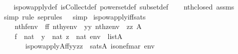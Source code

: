 \begin{isabellebody}
%
\isadelimproof
\ \ %
\endisadelimproof
%
\isatagproof
{}\isamarkupfalse%
\ is{\isacharunderscore}{\kern0pt}powapply{\isacharunderscore}{\kern0pt}def\ is{\isacharunderscore}{\kern0pt}Collect{\isacharunderscore}{\kern0pt}def\ powerset{\isacharunderscore}{\kern0pt}def\ subset{\isacharunderscore}{\kern0pt}def\isanewline
\ \ \isamarkupfalse%
\ nth{\isacharunderscore}{\kern0pt}closed\ assms\isanewline
\ \ \ \isamarkupfalse%
\ {\isacharparenleft}{\kern0pt}simp{\isacharparenright}{\kern0pt}\ {\isacharparenleft}{\kern0pt}rule\ sep{\isacharunderscore}{\kern0pt}rules\ \ {\isacharbar}{\kern0pt}\ simp{\isacharparenright}{\kern0pt}{\isacharplus}{\kern0pt}%
\endisatagproof
{\isafoldproof}%
%
\isadelimproof
\isanewline
%
\endisadelimproof
\isanewline
{}\isamarkupfalse%
\ is{\isacharunderscore}{\kern0pt}powapply{\isacharunderscore}{\kern0pt}iff{\isacharunderscore}{\kern0pt}sats{\isacharcolon}{\kern0pt}\isanewline
\ \ \isanewline
\ \ \ \ {\isachardoublequoteopen}nth{\isacharparenleft}{\kern0pt}f{\isacharcomma}{\kern0pt}env{\isacharparenright}{\kern0pt}\ {\isacharequal}{\kern0pt}\ ff{\isachardoublequoteclose}\ {\isachardoublequoteopen}nth{\isacharparenleft}{\kern0pt}y{\isacharcomma}{\kern0pt}env{\isacharparenright}{\kern0pt}\ {\isacharequal}{\kern0pt}\ yy{\isachardoublequoteclose}\ {\isachardoublequoteopen}nth{\isacharparenleft}{\kern0pt}z{\isacharcomma}{\kern0pt}env{\isacharparenright}{\kern0pt}\ {\isacharequal}{\kern0pt}\ zz{\isachardoublequoteclose}\ {\isachardoublequoteopen}{}{\isasymin}A{\isachardoublequoteclose}\isanewline
\ \ \ \ {\isachardoublequoteopen}f\ {\isasymin}\ nat{\isachardoublequoteclose}\ \ {\isachardoublequoteopen}y\ {\isasymin}\ nat{\isachardoublequoteclose}\ {\isachardoublequoteopen}z\ {\isasymin}\ nat{\isachardoublequoteclose}\ {\isachardoublequoteopen}env\ {\isasymin}\ list{\isacharparenleft}{\kern0pt}A{\isacharparenright}{\kern0pt}{\isachardoublequoteclose}\isanewline
\ \ \isanewline
\ \ \ \ \ \ \ {\isachardoublequoteopen}is{\isacharunderscore}{\kern0pt}powapply{\isacharparenleft}{\kern0pt}{\isacharhash}{\kern0pt}{\isacharhash}{\kern0pt}A{\isacharcomma}{\kern0pt}ff{\isacharcomma}{\kern0pt}yy{\isacharcomma}{\kern0pt}zz{\isacharparenright}{\kern0pt}\ {\isasymlongleftrightarrow}\ sats{\isacharparenleft}{\kern0pt}A{\isacharcomma}{\kern0pt}\ {\isacharquery}{\kern0pt}is{\isacharunderscore}{\kern0pt}one{\isacharunderscore}{\kern0pt}fm{\isacharparenleft}{\kern0pt}a{\isacharcomma}{\kern0pt}r{\isacharparenright}{\kern0pt}{\isacharcomma}{\kern0pt}\ env{\isacharparenright}{\kern0pt}{\isachardoublequoteclose}\isanewline

\end{isabellebody}
